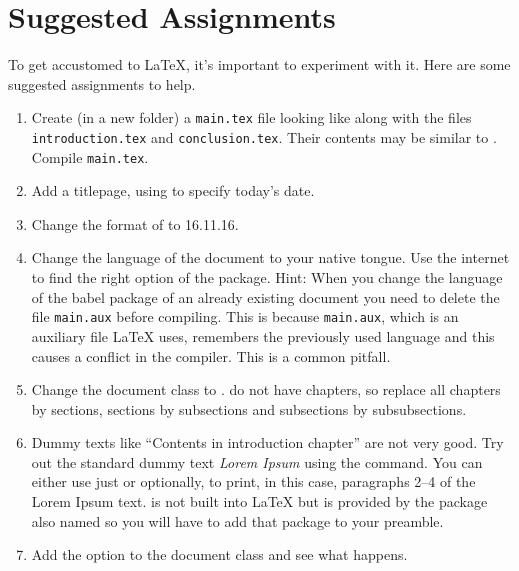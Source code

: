 {\section{Suggested Assignments}
To get accustomed to \LaTeX{}, it's important to experiment with it. Here are some suggested assignments to help.
\begin{enumerate}
	\item Create (in a new folder) a \verb|main.tex| file looking like  along with the files \verb|introduction.tex| and \verb|conclusion.tex|. Their contents may be similar to . Compile \verb|main.tex|.
	\item Add a titlepage, using \latexin{\today} to specify today's date.
	\item Change the format of \latexin{\today} to 16.11.16.
	\item Change the language of the document to your native tongue. Use the internet to find the right option of the  package. Hint: When you change the language of the babel package of an already existing document you need to delete the file \verb|main.aux| before compiling. This is because \verb|main.aux|, which is an auxiliary file \LaTeX{} uses, remembers the previously used language and this causes a conflict in the compiler. This is a common pitfall.
	\item Change the document class to .  do not have chapters, so replace all chapters by sections, sections by subsections and subsections by subsubsections.
	\item Dummy texts like ``Contents in introduction chapter'' are not very good. Try out the standard dummy text \emph{Lorem Ipsum} using the \latexin{\lipsum} command. You can either use just \latexin{\lipsum} or optionally, \latexin{\lipsum[2-4]} to print, in this case, paragraphs 2--4 of the Lorem Ipsum text. \latexin{\lipsum} is not built into \LaTeX{} but is provided by the package also named  so you will have to add that package to your preamble.
	\item Add the option  to the document class and see what happens.
\end{enumerate}

}

